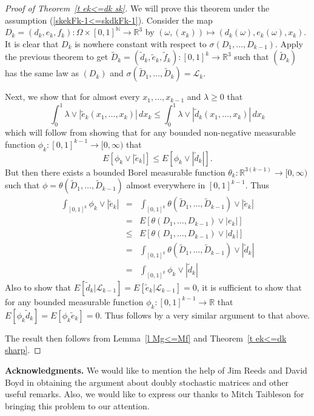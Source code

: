 \documentclass[12pt]{amsart}
\begin{document}
\begin{proof}[Proof of Theorem~\ref{t ek<=dk sk}]
We will prove this theorem under the assumption
(\ref{skekFk-1<=skdkFk-1}). Consider the map
$D_k=(d_k,e_k,f_k):\Omega \times [0,1]^\mathbb{N} \rightarrow
\mathbb{R}^3$ by $(\omega,(x_k))\mapsto
(d_k(\omega),e_k(\omega),x_k)$. It is clear that $D_k$ is nowhere
constant with respect to $\sigma(D_1,\dots,D_{k-1})$. Apply the
previous theorem to get
$\widetilde{D}_k=(\widetilde{d}_k,\widetilde{e}_k,\widetilde{f}_k):[0,1]^k
\rightarrow \mathbb{R}^3 $ such that $(\widetilde{D}_k)$ has the
same law as $(D_k)$ and
$\sigma(\widetilde{D}_1,\dots,\widetilde{D}_k)=\mathcal{L}_k$.

Next, we show that for almost every $x_1, \dots,x_{k-1}$ and
$\lambda \ge 0$ that
\[ \int_0^1 \lambda \vee |\widetilde e_k(x_1,\dots,x_k)| \, dx_k
   \le
   \int_0^1 \lambda \vee |\widetilde d_k(x_1,\dots,x_k)| \, dx_k \]
which will follow from showing that for any
bounded non-negative measurable function
$\phi_k : [0,1]^{k-1} \rightarrow [0,\infty)$ that
\[ E[\phi_k \vee |\widetilde{e}_k|]
\leq E[\phi_k \vee |\widetilde{d}_k|] .\] But then there exists a
bounded Borel measurable function $\theta_k : \mathbb{R}^{3(k-1)}
\rightarrow [0,\infty)$ such that
$\phi=\theta(\widetilde{D}_1,\dots,\widetilde{D}_{k-1})$ almost
everywhere in $[0,1]^{k-1}$. Thus
\begin{eqnarray*}
\int_{[0,1]^k} \phi_k \vee |\widetilde{e}_k| &=&\int_{[0,1]^k}
\theta(\widetilde{D}_1,\dots,\widetilde{D}_{k-1})\vee
   |\widetilde{e}_k| \\
&=& E[ \theta(D_1,\dots,D_{k-1}) \vee |e_k|] \\
&\le& E[ \theta(D_1,\dots,D_{k-1}) \vee |d_k|] \\
&=&\int_{[0,1]^k}
\theta(\widetilde{D}_1,\dots,\widetilde{D}_{k-1})\vee
   |\widetilde{d}_k| \\
&=&
\int_{[0,1]^k} \phi_k \vee |\widetilde{d}_k|
\end{eqnarray*}
Also to show that
$E[\widetilde{d}_k|\mathcal{L}_{k-1}]=E[\widetilde{e}_k|\mathcal{L}_{k-1}]=0$,
it is sufficient to show that for any bounded measurable function
$\phi_k : [0,1]^{k-1} \rightarrow \mathbb{R}$ that $E[\phi_k
\widetilde{d}_k]=E[\phi_k \widetilde{e}_k]=0$.  Thus follows by a
very similar argument to that above.

The result then
follows from Lemma~\ref{l Mg<=Mf} and Theorem~\ref{t ek<=dk sharp}.
\end{proof}

{\bf Acknowledgments.} We would like to mention the help of Jim
Reeds and David Boyd in obtaining the argument about doubly
stochastic matrices and other useful remarks.  Also, we would like to
express our thanks
to Mitch Taibleson for bringing this problem to our attention.
\end{document}
